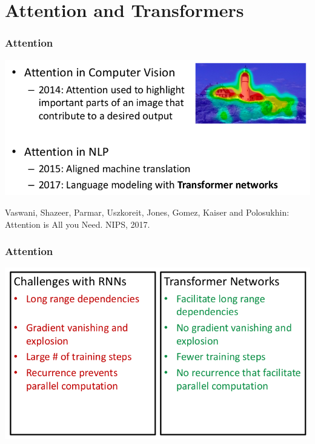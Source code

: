 \documentclass[10pt]{beamer}
\begin{document}
\section{Attention and Transformers} 

\begin{frame}
  \frametitle{Attention}
\begin{center}
\includegraphics[width=.9\textwidth]{images/p1}
\end{center}

\scriptsize{Vaswani, Shazeer, Parmar, Uszkoreit, Jones, Gomez, Kaiser and Polosukhin: Attention is All you Need. NIPS, 2017.}
\end{frame}


\begin{frame}
  \frametitle{Attention}
\begin{center}
\includegraphics[width=.8\textwidth]{images/p2}
\end{center}
\end{frame}
\end{document}
